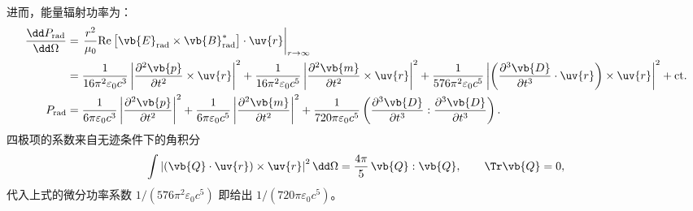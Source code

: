 进而，能量辐射功率为：
\begin{align*}
	\frac{\dd P_{\text{rad}}}{\dd \Omega} & = \left. \frac{r^2}{\mu_0} \text{Re}\left[ \vb{E}_{\text{rad}} \times \vb{B}_{\text{rad}}^* \right] \cdot \uv{r} \right|_{r \to \infty}                                                                                                                                                                                 \\&= \frac{1}{16\pi^2\varepsilon_0 c^3} \left| \frac{\partial^2 \vb{p}}{\partial t^2} \times \uv{r} \right|^2 + \frac{1}{16\pi^2\varepsilon_0 c^5} \left| \frac{\partial^2 \vb{m}}{\partial t^2} \times \uv{r} \right|^2
	+ \frac{1}{576\pi^2\varepsilon_0 c^5} \left| \left( \frac{\partial^3 \vb{D}}{\partial t^3} \cdot \uv{r} \right) \times \uv{r} \right|^2 + \text{ct}.                                                                                                                                                                                                          \\
	P_{\text{rad}}                      & = \frac{1}{6\pi\varepsilon_0 c^3} \left| \frac{\partial^2 \vb{p}}{\partial t^2} \right|^2 + \frac{1}{6\pi\varepsilon_0 c^5} \left| \frac{\partial^2 \vb{m}}{\partial t^2} \right|^2 + \frac{1}{720\pi\varepsilon_0 c^5} \left( \frac{\partial^3 \vb{D}}{\partial t^3} : \frac{\partial^3 \vb{D}}{\partial t^3} \right).
\end{align*}
四极项的系数来自无迹条件下的角积分
\begin{align*}
	\int \left|(\vb{Q}\cdot\uv{r})\times\uv{r}\right|^2 \dd\Omega
	=\frac{4\pi}{5}\,\vb{Q}:\vb{Q},\qquad \Tr \vb{Q}=0,
\end{align*}
代入上式的微分功率系数 \(1/(576\pi^2\varepsilon_0 c^5)\) 即给出 \(1/(720\pi\varepsilon_0 c^5)\)。

